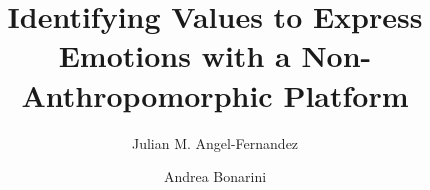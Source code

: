 %
%
%
%
%
%
\RequirePackage{fix-cm}
%
\documentclass[smallextended]{svjour3}       %
%
\smartqed  %
%
\usepackage{graphicx}
\usepackage{slashbox}     
\usepackage{subfigure}
\usepackage{breakcites}
%
%
%
%
%


\title{Identifying Values to Express Emotions with a Non-Anthropomorphic Platform%
}


\author{Julian M. Angel-Fernandez         \and
        Andrea Bonarini %
}


